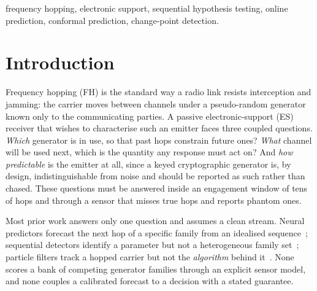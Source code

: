 \documentclass[conference]{IEEEtran}
\begin{document}
\begin{IEEEkeywords}
frequency hopping, electronic support, sequential hypothesis testing,
online prediction, conformal prediction, change-point detection.
\end{IEEEkeywords}

\section{Introduction}
Frequency hopping (FH) is the standard way a radio link resists interception
and jamming: the carrier moves between channels under a pseudo-random
generator known only to the communicating parties. A passive electronic-support
(ES) receiver that wishes to characterise such an emitter faces three coupled
questions. \emph{Which} generator is in use, so that past hops constrain future
ones? \emph{What} channel will be used next, which is the quantity any response
must act on? And \emph{how predictable} is the emitter at all, since a keyed
cryptographic generator is, by design, indistinguishable from noise and should
be reported as such rather than chased. These questions must be answered inside
an engagement window of tens of hops and through a sensor that misses true
hops and reports phantom ones.

Most prior work answers only one question and assumes a clean stream. Neural
predictors forecast the next hop of a specific family from an idealised
sequence~\cite{li2020lstm,li2021china,zhu2023recovery,basak2024spectrum};
sequential detectors identify a parameter but not a heterogeneous family
set~\cite{baum1994,dragalin1999}; particle filters track a hopped carrier but
not the \emph{algorithm} behind it~\cite{valyrakis2009,sidiropoulos2006}. None
scores a bank of competing generator families through an explicit sensor model,
and none couples a calibrated forecast to a decision with a stated guarantee.
\end{document}
